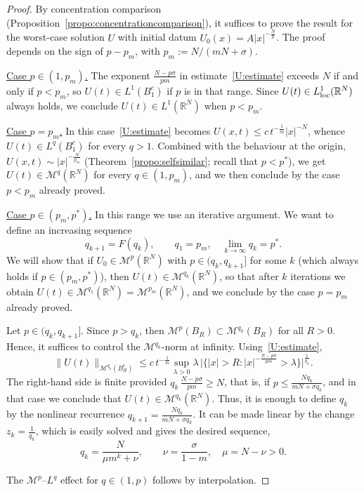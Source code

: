 \documentclass[leqno,12pt]{amsart}
\theoremstyle{definition}
\theoremstyle{remark}
\numberwithin{equation}{section}
\begin{document}
\begin{proof}
By concentration comparison (Proposition~\ref{propo:concentrationcomparison}), it suffices to
prove the result for the worst-case solution $U$ with initial datum $U_0(x)=A|x|^{-\frac{N}{p}}$. The proof depends on the sign of $p-p_m$, with $p_m:=N/(mN+\sigma)$.

\noindent\underline{Case $p \in (1, p_m)$.}  The exponent $\frac{N-p\sigma}{pm}$ in estimate~\eqref{U:estimate} exceeds $N$ if and only if $p<p_m$, so $U(t)\in L^1(B_1^c)$ if $p$ is in that range. Since $U(t)\in L^1_{\textup{loc}}(\mathbb{R}^N)$ always holds, we conclude $U(t)\in L^1(\mathbb{R}^N)$ when $p<p_m$.

\noindent\underline{Case $p =p_m$.} In this case~\eqref{U:estimate} becomes $U(x,t)\le
c\,t^{-\frac{1}{m}}|x|^{-N}$, whence $U(t)\in L^q(B_1^c)$ for every $q>1$. Combined with the behaviour at the origin, $U(x,t)\sim|x|^{-\frac{N}{p_m}}$ (Theorem~\ref{propo:selfsimilar}; recall that $p<p^*$), we get $U(t)\in\mathcal{M}^q(\mathbb{R}^N)$ for every $q\in(1,p_m)$, and we then conclude by the case $p<p_m$ already proved.

\noindent\underline{Case $p\in(p_m,p^*)$.} In this range we use an iterative argument. 
We want to define an increasing sequence
\[
    q_{k+1}=F(q_k), \qquad q_1=p_m,\quad \lim_{k\to\infty}q_k=p^*.
\]
We will show that if $U_0\in\mathcal{M}^p(\mathbb{R}^N)$ with $p\in(q_k,q_{k+1}]$  for some $k$ (which always holds if $p\in(p_m,p^*)$), then $U(t)\in\mathcal{M}^{q_k}(\mathbb{R}^N)$,
so that after $k$ iterations we obtain $U(t)\in\mathcal{M}^{q_1}(\mathbb{R}^N)
=\mathcal{M}^{p_m}(\mathbb{R}^N)$, and we conclude by the case $p=p_m$ already proved.

Let $p\in(q_k,q_{k+1}]$. Since $p>q_k$, then $\mathcal{M}^{p}(B_R)\subset\mathcal{M}^{q_k}(B_R)$ for all $R>0$. Hence, it suffices to control the $\mathcal{M}^{q_k}$-norm at infinity. Using~\eqref{U:estimate},
\begin{equation}\label{eq:q_k}
    \|U(t)\|_{\mathcal{M}^{q_k}(B_R^c)}
    \le c\,t^{-\frac{1}{m}}
    \sup_{\lambda>0}\lambda\,\bigl|\bigl\{|x|>R:|x|^{-\frac{N-p\sigma}{pm}}>\lambda\bigr\}\bigr|^{\frac{1}{q_k}}.
\end{equation}
The right-hand side is finite provided $q_k\, \frac{N-p\sigma}{pm}\ge N$, that is, if $p\le\frac{Nq_k}{mN+\sigma q_k}$, and in that case we conclude that $U(t)\in\mathcal{M}^{q_k}(\mathbb{R}^N)$. Thus, it is enough to define $q_k$ by the nonlinear recurrence $q_{k+1}=\frac{Nq_k}{mN+\sigma q_k}$. It can be made linear by the change $z_k=\frac 1{q_k}$, which is easily solved and gives the desired sequence,
\[
    q_k=\frac{N}{\mu m^{k}+\nu}, \qquad \nu=\frac{\sigma}{1-m},\quad \mu=N-\nu>0.
\]

The $\mathcal{M}^p$--$L^q$ effect for $q\in(1,p)$  follows by interpolation.
\end{proof}
\end{document}
